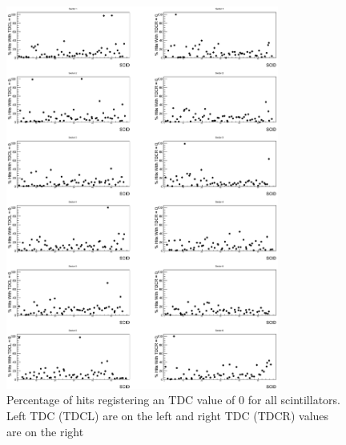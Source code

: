 \begin{figure}
    \includegraphics[width=0.8\textwidth]{figures/calib/tof/tofko/tdc.eps}
    \caption{Percentage of hits registering an TDC value of 0 for all scintillators. Left TDC (TDCL) are on the left and right TDC (TDCR) values are on the right}
    \label{plt:tdc0vSCID}
\end{figure}

